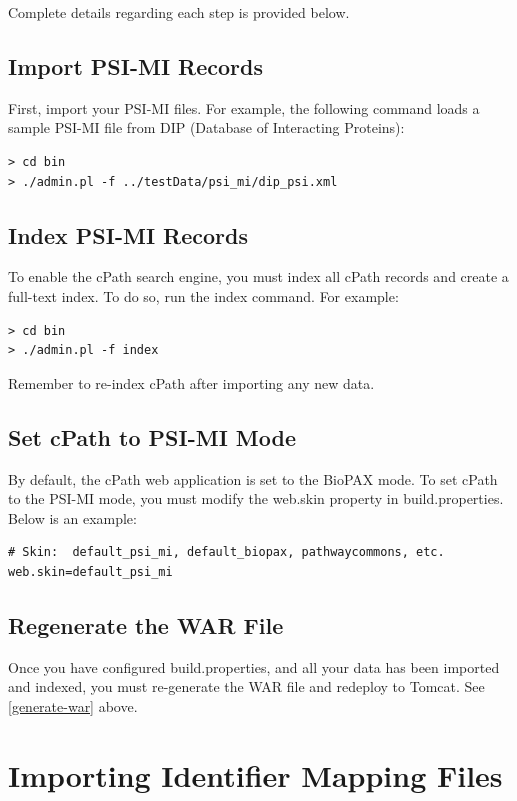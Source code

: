 \documentclass[letterpaper,12pt]{article}
\begin{document}
Complete details regarding each step is provided below.

\subsection{Import PSI-MI Records}

First, import your PSI-MI files.  For example, the following command loads a sample PSI-MI file from DIP (Database of Interacting Proteins):

\begin{verbatim}
> cd bin
> ./admin.pl -f ../testData/psi_mi/dip_psi.xml
\end{verbatim}

\subsection{Index PSI-MI Records}

To enable the cPath search engine, you must index all cPath records and create a full-text index.  To do so, run the index command.  For example:

\begin{verbatim}
> cd bin
> ./admin.pl -f index
\end{verbatim}

Remember to re-index cPath after importing any new data.

\subsection{Set cPath to PSI-MI Mode}

By default, the cPath web application is set to the BioPAX mode.  To set cPath to the PSI-MI mode, you must modify the web.skin property in build.properties.  Below is an example:

\begin{verbatim}
# Skin:  default_psi_mi, default_biopax, pathwaycommons, etc.
web.skin=default_psi_mi
\end{verbatim} 

\subsection{Regenerate the WAR File}

Once you have configured build.properties, and all your data has been imported and indexed, you must re-generate the WAR file and redeploy to Tomcat.  See \ref{generate-war} above.

\section{Importing Identifier Mapping Files}
\end{document}
